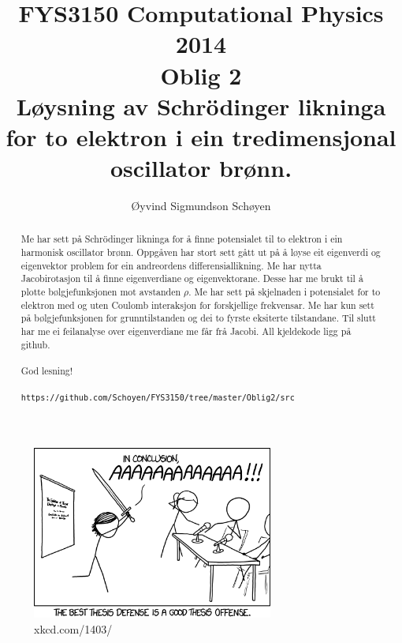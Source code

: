 \documentclass[11pt, a4paper]{article}
\begin{document}
\begin{titlepage}

  \title{\normalsize FYS3150 Computational Physics 2014\\
  \vspace{10mm}
  \huge Oblig 2\\
  \vspace{10mm}
  \normalsize {\bf Løysning av Schrödinger likninga for to elektron i ein tredimensjonal oscillator brønn.}}

  \author{Øyvind Sigmundson Schøyen}

\end{titlepage}

\maketitle

\begin{figure}[H]
  \centering
  \includegraphics[width=300px]{thesis_defense.png}
  \caption{xkcd.com/1403/}
\end{figure}

\newpage
\begin{abstract}
  Me har sett på Schrödinger likninga for å finne potensialet til to elektron i ein harmonisk oscillator brønn. Oppgåven har stort sett gått ut på å løyse 
  eit eigenverdi og eigenvektor problem for ein andreordens differensiallikning. Me har nytta Jacobirotasjon til å finne eigenverdiane og eigenvektorane. 
  Desse har me brukt til å plotte bølgjefunksjonen mot avstanden $\rho$. Me har sett på skjelnaden i potensialet for to elektron med og uten Coulomb interaksjon for 
  forskjellige frekvensar. Me har kun sett på bølgjefunksjonen for grunntilstanden og dei to fyrste eksiterte tilstandane. Til slutt har me ei feilanalyse over eigenverdiane 
  me får frå Jacobi. All kjeldekode ligg på github. \\ \\
  God lesning! \\ \\
  \texttt{https://github.com/Schoyen/FYS3150/tree/master/Oblig2/src}
\end{abstract}
\end{document}
